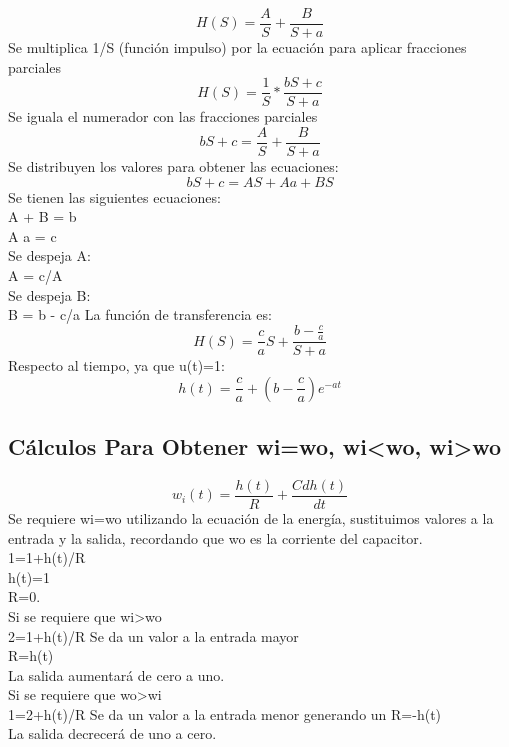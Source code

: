 \documentclass[12pt,letterpaper]{article}     %
\begin{document}
\begin{equation}\label{eq:ej7}
H(S) = \frac{A}{S}+\frac{B}{S+a}
\end{equation}
Se multiplica 1/S (función impulso) por la ecuación para aplicar fracciones parciales
\begin{equation}\label{eq:ej8}
H(S) =\frac{1}{S}*\frac{bS+c}{S+a}
\end{equation}
Se iguala el numerador con las fracciones parciales
\begin{equation}\label{eq:ej9}
bS+c = \frac{A}{S}+\frac{B}{S+a}
\end{equation}
Se distribuyen los valores para obtener las ecuaciones:
\begin{equation}\label{eq:ej10}
bS+c = AS+Aa+BS
\end{equation}
Se tienen las siguientes ecuaciones:\\
A + B = b\\
A a = c\\
Se despeja A:\\
A = c/A\\
Se despeja B:\\
B = b - c/a
La función de transferencia es:
\begin{equation}\label{eq:ej11}
H(S) = \frac{c}{a}S + \frac{b-\frac{c}{a}}{S+a}
\end{equation}
Respecto al tiempo, ya que u(t)=1:
\begin{equation}\label{eq:ej11}
h(t) = \frac{c}{a} + (b-\frac{c}{a})e^{-at}
\end{equation}
\subsection*{Cálculos Para Obtener wi=wo, wi<wo, wi>wo}
\begin{equation}\label{eq:ej12}
w_{i}(t) = \frac{h(t)}{R} + \frac{Cdh(t)}{dt}
\end{equation}
Se requiere wi=wo utilizando la ecuación de la energía, sustituimos valores a la entrada y la salida, recordando que wo es la corriente del capacitor.\\
1=1+h(t)/R\\
h(t)=1\\
R=0.\\

Si se requiere que wi>wo\\
2=1+h(t)/R
Se da un valor a la entrada mayor\\
R=h(t)\\
La salida aumentará de cero a uno.\\
Si se requiere que wo>wi\\
1=2+h(t)/R
Se da un valor a la entrada menor generando un R=-h(t)\\
La salida decrecerá de uno a cero.\\
\end{document}
